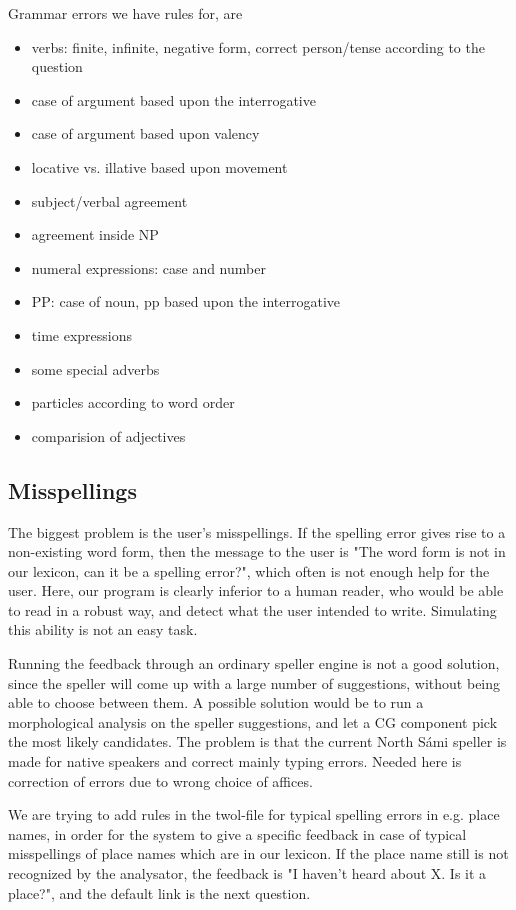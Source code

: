 \documentclass[11pt]{article}
\begin{document}
Grammar errors we have rules for, are
\begin{itemize}
\setlength{\itemsep}{-0.2cm}
\item verbs: finite, infinite, negative form, correct person/tense according to the question
\item case of argument based upon the interrogative 
\item case of argument based upon valency
\item locative vs. illative based upon movement
\item subject/verbal agreement
\item agreement inside NP 
\item numeral expressions: case and number 
\item PP: case of noun, pp based upon the interrogative 
\item time expressions 
\item some special adverbs 
\item particles according to word order
\item comparision of adjectives
\end{itemize}

\subsection{Misspellings}
The biggest problem is the user's misspellings. If the spelling error gives rise to a non-existing word form, then the message to the user is "The word form is not in our lexicon, can it be a spelling error?", which often is not enough help for the user. Here, our program is clearly inferior to a human reader, who would be able to read in a robust way, and detect what the user intended to write. Simulating this ability is not an easy task.
 
Running the feedback through an ordinary speller engine is not a good solution, since the speller will come up with a large number of suggestions, without being able to choose between them. A possible solution would be to run a morphological analysis on the speller suggestions, and let a CG component pick the most likely candidates. The problem is that the current North Sámi speller is made for native speakers and correct mainly typing errors. Needed here is correction of errors due to wrong choice of affices.

We are trying to add rules in the twol-file for typical spelling errors in e.g. place names, in order for the system to give a specific feedback in case of typical misspellings of place names which are in our lexicon. If the place name still is not recognized by the analysator, the feedback is "I haven’t heard about X. Is it a 
place?", and the default link is the next question.
\end{document}
